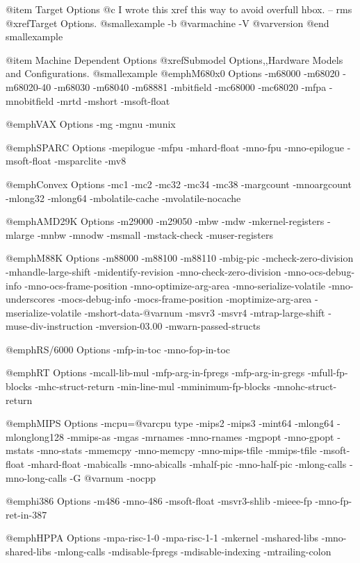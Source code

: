 @item Target Options
@c I wrote this xref this way to avoid overfull hbox. -- rms
@xref{Target Options}.
@smallexample
-b @var{machine}  -V @var{version}
@end smallexample

@item Machine Dependent Options
@xref{Submodel Options,,Hardware Models and Configurations}.
@smallexample
@emph{M680x0 Options}
-m68000  -m68020  -m68020-40  -m68030  -m68040  -m68881  
-mbitfield  -mc68000  -mc68020  -mfpa  -mnobitfield  
-mrtd  -mshort  -msoft-float 

@emph{VAX Options}
-mg  -mgnu  -munix

@emph{SPARC Options}
-mepilogue  -mfpu  -mhard-float
-mno-fpu  -mno-epilogue  -msoft-float
-msparclite  -mv8

@emph{Convex Options}
-mc1  -mc2  -mc32  -mc34  -mc38
-margcount  -mnoargcount
-mlong32  -mlong64
-mbolatile-cache  -mvolatile-nocache

@emph{AMD29K Options} 
-m29000  -m29050  -mbw  -mdw  -mkernel-registers
-mlarge  -mnbw  -mnodw  -msmall  -mstack-check
-muser-registers

@emph{M88K Options}
-m88000  -m88100  -m88110  -mbig-pic  
-mcheck-zero-division  -mhandle-large-shift 
-midentify-revision  -mno-check-zero-division 
-mno-ocs-debug-info  -mno-ocs-frame-position 
-mno-optimize-arg-area  -mno-serialize-volatile
-mno-underscores  -mocs-debug-info
-mocs-frame-position  -moptimize-arg-area
-mserialize-volatile  -mshort-data-@var{num}  -msvr3 
-msvr4  -mtrap-large-shift  -muse-div-instruction 
-mversion-03.00  -mwarn-passed-structs

@emph{RS/6000 Options}
-mfp-in-toc  -mno-fop-in-toc

@emph{RT Options}
-mcall-lib-mul  -mfp-arg-in-fpregs  -mfp-arg-in-gregs
-mfull-fp-blocks  -mhc-struct-return  -min-line-mul
-mminimum-fp-blocks  -mnohc-struct-return

@emph{MIPS Options}
-mcpu=@var{cpu  type}  -mips2  -mips3  -mint64
-mlong64  -mlonglong128  -mmips-as  -mgas  -mrnames
-mno-rnames  -mgpopt  -mno-gpopt  -mstats  -mno-stats
-mmemcpy  -mno-memcpy  -mno-mips-tfile  -mmips-tfile
-msoft-float  -mhard-float  -mabicalls  -mno-abicalls
-mhalf-pic  -mno-half-pic -mlong-calls -mno-long-calls
-G  @var{num}  -nocpp

@emph{i386 Options}
-m486  -mno-486  -msoft-float  -msvr3-shlib  -mieee-fp
-mno-fp-ret-in-387

@emph{HPPA Options}
-mpa-risc-1-0
-mpa-risc-1-1
-mkernel
-mshared-libs
-mno-shared-libs
-mlong-calls
-mdisable-fpregs
-mdisable-indexing
-mtrailing-colon

